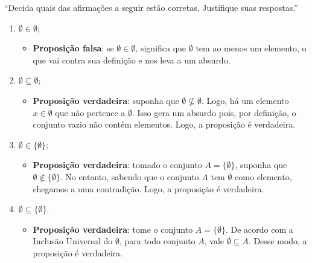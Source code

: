 \enquote{Decida quais das afirmações a seguir estão corretas. Justifique suas respostas.}
    \begin{enumerate}
        \item $\emptyset \in \emptyset$;
        \begin{itemize}
            \item \textbf{Proposição falsa}: se $\emptyset \in \emptyset$, significa que $\emptyset$ tem ao menos um elemento, o que vai contra sua definição e nos leva a um absurdo.
        \end{itemize}
        \item $\emptyset \subseteq \emptyset$;
        \begin{itemize}
            \item \textbf{Proposição verdadeira}: suponha que $\emptyset \nsubseteq \emptyset$. Logo, há um elemento $x \in \emptyset$ que não pertence a $\emptyset$. Isso gera um absurdo pois, por definição, o conjunto vazio não contém elementos. Logo, a proposição é verdadeira.
        \end{itemize}
        \item $\emptyset \in \{\emptyset\}$;
        \begin{itemize}
            \item \textbf{Proposição verdadeira}: tomado o conjunto $A = \{\emptyset\}$, suponha que $\emptyset \notin \{\emptyset\}$. No entanto, sabendo que o conjunto $A$ tem $\emptyset$ como elemento, chegamos a uma contradição. Logo, a proposição é verdadeira.
        \end{itemize}
        \item $\emptyset \subseteq \{\emptyset\}$.
        \begin{itemize}
            \item \textbf{Proposição verdadeira}: tome o conjunto $A = \{\emptyset\}$. De acordo com a Inclusão Universal do $\emptyset$, para todo conjunto $A$, vale $\emptyset \subseteq A$. Desse modo, a proposição é verdadeira.
        \end{itemize}
    \end{enumerate}
